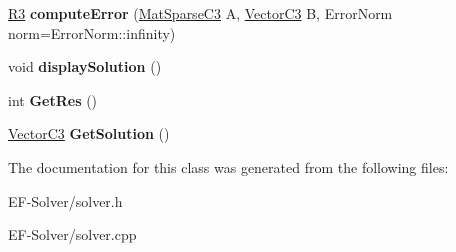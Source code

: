 \begin{DoxyCompactItemize}
\item 
\hyperlink{class_r3}{R3} {\bfseries compute\+Error} (\hyperlink{class_mat_sparse_c3}{Mat\+Sparse\+C3} A, \hyperlink{class_vector_c3}{Vector\+C3} B, Error\+Norm norm=Error\+Norm\+::infinity)\hypertarget{class_solver_a87d7a1ec6b1dc58d6cf13031b25f6ff6}{}\label{class_solver_a87d7a1ec6b1dc58d6cf13031b25f6ff6}

\item 
void {\bfseries display\+Solution} ()\hypertarget{class_solver_a3f7ea5193c5e7f64deb6d6baf30d135c}{}\label{class_solver_a3f7ea5193c5e7f64deb6d6baf30d135c}

\item 
int {\bfseries Get\+Res} ()\hypertarget{class_solver_aeda9b18dda62b66d0d36467b7a1be89d}{}\label{class_solver_aeda9b18dda62b66d0d36467b7a1be89d}

\item 
\hyperlink{class_vector_c3}{Vector\+C3} {\bfseries Get\+Solution} ()\hypertarget{class_solver_a3f228651fbb74d274e8336285f79d14e}{}\label{class_solver_a3f228651fbb74d274e8336285f79d14e}

\end{DoxyCompactItemize}


The documentation for this class was generated from the following files\+:\begin{DoxyCompactItemize}
\item 
E\+F-\/\+Solver/solver.\+h\item 
E\+F-\/\+Solver/solver.\+cpp\end{DoxyCompactItemize}
